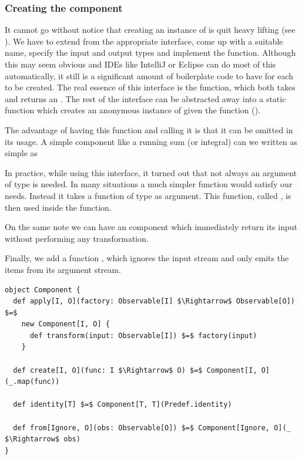 \subsubsection{Creating the component}
It cannot go without notice that creating an instance of \comp is quit heavy lifting (see ). We have to extend from the appropriate interface, come up with a suitable name, specify the input and output types and implement the  function. Although this may seem obvious and IDEs like IntelliJ or Eclipse can do most of this automatically, it still is a significant amount of boilerplate code to have for each \comp to be created. The real essence of this interface is the  function, which both takes and returns an \obs. The rest of the interface can be abstracted away into a static function which creates an anonymous instance of \comp given the  function ().

The advantage of having this function and calling it  is that it can be omitted in its usage. A simple component like a running sum (or integral) can we written as simple as 

In practice, while using this interface, it turned out that not always an argument of type  is needed. In many situations a much simpler function would satisfy our needs. Instead it takes a function of type  as argument. This function, called , is then used inside the  function.

On the same note we can have an  component which immediately return its input without performing any transformation.

Finally, we add a function , which ignores the input stream and only emits the items from its argument stream.

\begin{minipage}{\linewidth}
\begin{lstlisting}[style=ScalaStyle, caption={Various ways to create a \comp}, label={lst:creating-component}]
object Component {
  def apply[I, O](factory: Observable[I] $\Rightarrow$ Observable[O]) $=$
    new Component[I, O] {
      def transform(input: Observable[I]) $=$ factory(input)
    }

  def create[I, O](func: I $\Rightarrow$ O) $=$ Component[I, O](_.map(func))
  
  def identity[T] $=$ Component[T, T](Predef.identity)
  
  def from[Ignore, O](obs: Observable[O]) $=$ Component[Ignore, O](_ $\Rightarrow$ obs)
}
\end{lstlisting}
\end{minipage}

